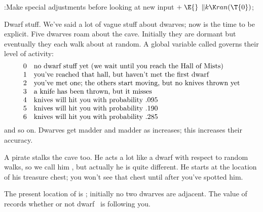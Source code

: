 \Y\B\4:Make special adjustments before looking at new input\X${}\mathrel+\E{}$\6
$\|k\K\\{ran}(\T{0}){}$;\par
\fi

Dwarf stuff. We've said a lot of vague stuff about dwarves; now is the time
to be explicit. Five dwarves roam about the cave. Initially they are
dormant but eventually they each walk about at random.
A global variable called  governs their level of activity:
$$\vcenter{\halign{#\quad&#\hfil\cr
0&no dwarf stuff yet (we wait until you reach the Hall of Mists)\cr
1&you've reached that hall, but haven't met the first dwarf\cr
2&you've met one; the others start moving, but no knives thrown yet\cr
3&a knife has been thrown, but it misses\cr
4&knives will hit you with probability .095\cr
5&knives will hit you with probability .190\cr
6&knives will hit you with probability .285\cr}}$$
and so on. Dwarves get madder and madder as  increases; this
increases their accuracy.

A pirate stalks the cave too. He acts a lot like a dwarf with respect to
random walks, so we call him , but actually he is quite different.
He starts at the location of his treasure chest; you won't see that chest
until after you've spotted him.

The present location of  is ; initially no two
dwarves are adjacent. The value of
 records whether or not dwarf~ is following you.

